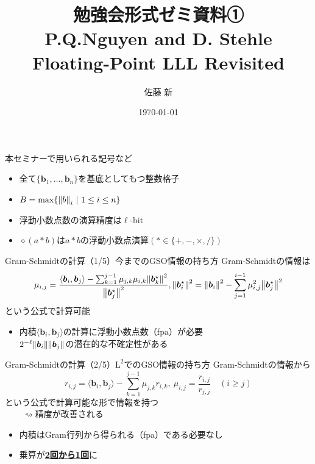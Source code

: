 \documentclass[12pt,aspectratio=169,xcolor=dvipsnames,table,dvipdfmx, leqno]{beamer}
\title[勉強会]{勉強会形式ゼミ資料①\\P.Q.Nguyen and D. Stehle Floating-Point LLL Revisited}
\author[佐藤]{佐藤 新}
\date{\today}
\begin{document}
\maketitle

\begin{frame}
    本セミナーで用いられる記号など
    \begin{itemize}
        \item 全て$\{\bm{b}_1,\ldots,\bm{b}_n\}$を基底としてもつ整数格子
        \item $B=\max\{\norm{b}_i~|~1\le i\le n\}$
        \item 浮動小数点数の演算精度は$\ell$-bit
        \item $\diamond(a*b)$は$a*b$の浮動小数点演算$(*\in\{+, -, \times, /\})$
    \end{itemize}
\end{frame}

\begin{frame}{Gram-Schmidtの計算（1/5）}{今までのGSO情報の持ち方}
    Gram-Schmidtの情報は
    \[
    \mu_{i, j}=\frac{\langle \bm{b}_i, \bm{b}_j\rangle-\sum_{k=1}^{j-1}\mu_{j, k}\mu_{i, k}\norm{\bm{b}_k^\star}^2}{\norm{\bm{b}_j^\star}^2}, \norm{\bm{b}_i^\star}^2=\norm{\bm{b}_i}^2-\sum_{j=1}^{i-1}\mu_{i, j}^2\norm{\bm{b}_j^\star}^2
    \]
    という公式で計算可能

    \begin{itemize}
        \item 内積$\langle \bm{b}_i, \bm{b}_j\rangle$の計算に浮動小数点数（fpa）が必要\\
        \quad\quad $2^{-\ell}\norm{\bm{b}_i}\norm{\bm{b}_j}$の潜在的な不確定性がある
    \end{itemize}
\end{frame}

\begin{frame}{Gram-Schmidtの計算（2/5）}{$\text{L}^2$でのGSO情報の持ち方}
    Gram-Schmidtの情報から
    \[
    r_{i, j}=\langle \bm{b}_i, \bm{b}_j\rangle-\sum_{k=1}^{j-1}\mu_{j, k}r_{i, k},~\mu_{i, j}=\frac{r_{i, j}}{r_{j, j}}\quad(i\ge j)
    \]
    という公式で計算可能な形で情報を持つ\\
    $\quad\quad\rightsquigarrow$精度が改善される
    \begin{itemize}
        \item 内積はGram行列から得られる（fpa）である必要なし
        \item 乗算が\underline{\textbf{2回から1回}}に
    \end{itemize}
\end{frame}
\end{document}
